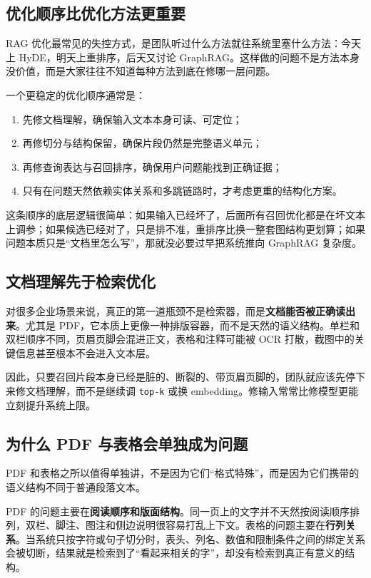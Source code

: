 \subsection{优化顺序比优化方法更重要}
RAG 优化最常见的失控方式，是团队听过什么方法就往系统里塞什么方法：今天上 HyDE，明天上重排序，后天又讨论 GraphRAG。这样做的问题不是方法本身没价值，而是大家往往不知道每种方法到底在修哪一层问题。

一个更稳定的优化顺序通常是：
\begin{enumerate}
  \item 先修文档理解，确保输入文本本身可读、可定位；
  \item 再修切分与结构保留，确保片段仍然是完整语义单元；
  \item 再修查询表达与召回排序，确保用户问题能找到正确证据；
  \item 只有在问题天然依赖实体关系和多跳链路时，才考虑更重的结构化方案。
\end{enumerate}

这条顺序的底层逻辑很简单：如果输入已经坏了，后面所有召回优化都是在坏文本上调参；如果候选已经对了，只是排不准，重排序比换一整套图结构更划算；如果问题本质只是“文档里怎么写”，那就没必要过早把系统推向 GraphRAG 复杂度。

\subsection{文档理解先于检索优化}
对很多企业场景来说，真正的第一道瓶颈不是检索器，而是\textbf{文档能否被正确读出来}。尤其是 PDF，它本质上更像一种排版容器，而不是天然的语义结构。单栏和双栏顺序不同，页眉页脚会混进正文，表格和注释可能被 OCR 打散，截图中的关键信息甚至根本不会进入文本层。

因此，只要召回片段本身已经是脏的、断裂的、带页眉页脚的，团队就应该先停下来修文档理解，而不是继续调 \texttt{top-k} 或换 embedding。修输入常常比修模型更能立刻提升系统上限。

\subsection{为什么 PDF 与表格会单独成为问题}
PDF 和表格之所以值得单独讲，不是因为它们“格式特殊”，而是因为它们携带的语义结构不同于普通段落文本。

PDF 的问题主要在\textbf{阅读顺序和版面结构}。同一页上的文字并不天然按阅读顺序排列，双栏、脚注、图注和侧边说明很容易打乱上下文。表格的问题主要在\textbf{行列关系}。当系统只按字符或句子切分时，表头、列名、数值和限制条件之间的绑定关系会被切断，结果就是检索到了“看起来相关的字”，却没有检索到真正有意义的结构。

